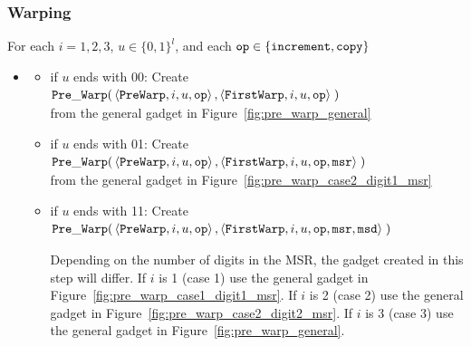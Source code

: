 \subsubsection{ Warping }

    For each $i = 1, 2, 3$, $u \in \{0, 1\}^l$, and each ${\tt op} \in \{ {\tt increment, copy } \}$


    \begin{itemize}
        \item {\prewarp}
            \begin{itemize}

            \item if $u$ ends with 00:
            Create
            $\begin{aligned}[t]
                {\tt Pre\_Warp}(& \left\langle {\tt PreWarp},   i, u, {\tt op} \right\rangle,
                           \left\langle {\tt FirstWarp}, i, u, {\tt op} \right\rangle \;)
            \end{aligned}$ \\ from the general gadget in Figure~\ref{fig:pre_warp_general}

            \item if $u$ ends with 01:
            Create
            $\begin{aligned}[t]
                {\tt Pre\_Warp}(& \left\langle {\tt PreWarp},   i, u, {\tt op} \right\rangle,
                           \left\langle {\tt FirstWarp}, i, u, {\tt op}, {\tt msr} \right\rangle \;)
            \end{aligned}$ \\ from the general gadget in Figure~\ref{fig:pre_warp_case2_digit1_msr}

            \item if $u$ ends with 11:
            Create
            $\begin{aligned}[t]
                {\tt Pre\_Warp}(& \left\langle {\tt PreWarp},   i, u, {\tt op} \right\rangle,
                           \left\langle {\tt FirstWarp}, i, u, {\tt op}, {\tt msr}, {\tt msd} \right\rangle \;)
            \end{aligned}$

            Depending on the number of digits in the MSR, the gadget created in this step will differ.
            If $i$ is 1 (case 1) use the general gadget in Figure~\ref{fig:pre_warp_case1_digit1_msr}.
            If $i$ is 2 (case 2) use the general gadget in Figure~\ref{fig:pre_warp_case2_digit2_msr}.
            If $i$ is 3 (case 3) use the general gadget in Figure~\ref{fig:pre_warp_general}.
        \end{itemize}
        \vspace{.5cm}


\end{itemize}

